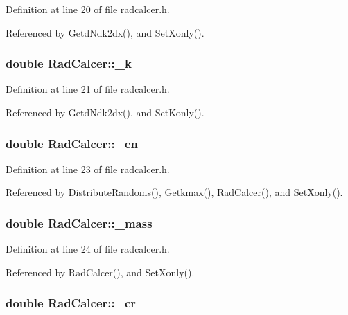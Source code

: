Definition at line 20 of file radcalcer.h.

Referenced by GetdNdk2dx(), and SetXonly().
\subsubsection{\setlength{\rightskip}{0pt plus 5cm}double {\bf RadCalcer::\_\-k}\hspace{0.3cm}{\tt  [private]}}\label{classRadCalcer_00c8fe44b15d733ae45a55fb3c5efbcb}




Definition at line 21 of file radcalcer.h.

Referenced by GetdNdk2dx(), and SetKonly().
\subsubsection{\setlength{\rightskip}{0pt plus 5cm}double {\bf RadCalcer::\_\-en}\hspace{0.3cm}{\tt  [private]}}\label{classRadCalcer_d815420ad92951fce8c20a4f86d6c236}




Definition at line 23 of file radcalcer.h.

Referenced by DistributeRandoms(), Getkmax(), RadCalcer(), and SetXonly().
\subsubsection{\setlength{\rightskip}{0pt plus 5cm}double {\bf RadCalcer::\_\-mass}\hspace{0.3cm}{\tt  [private]}}\label{classRadCalcer_8b21a8e4e8314996883334d9ce95d78b}




Definition at line 24 of file radcalcer.h.

Referenced by RadCalcer(), and SetXonly().
\subsubsection{\setlength{\rightskip}{0pt plus 5cm}double {\bf RadCalcer::\_\-cr}\hspace{0.3cm}{\tt  [private]}}\label{classRadCalcer_2401e88eb63c0b7525ab0bb9b1dff389}




